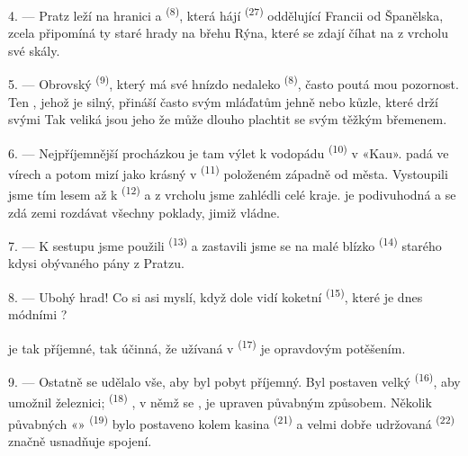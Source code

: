 4. --- Pratz leží na hranici a  \textsuperscript{(8)}, která hájí
 \textsuperscript{(27)} oddělující Francii od Španělska, zcela
připomíná ty staré hrady na břehu Rýna, které se zdají číhat na  z vrcholu své
skály.

5. --- Obrovský  \textsuperscript{(9)}, který má své hnízdo nedaleko
 \textsuperscript{(8)}, často poutá mou pozornost. Ten , jehož  je silný, přináší často svým mláďatům jehně nebo kůzle, které drží
svými  Tak veliká jsou jeho  že může dlouho plachtit se svým
těžkým břemenem.

\VUsaut{3.0mm}
\VUsaut{3.0mm}

6. --- Nejpříjemnější procházkou je tam výlet k vodopádu \textsuperscript{(10)} v «Kau».
 padá ve vírech a potom mizí jako krásný  v
 \textsuperscript{(11)} položeném západně od města. Vystoupili
jsme tím lesem až k  \textsuperscript{(12)} a z vrcholu
 jsme zahlédli celé  kraje.
 je podivuhodná a  se zdá zemi rozdávat všechny
poklady, jimiž vládne.

7. --- K sestupu jsme použili  \textsuperscript{(13)} a zastavili jsme se na
malé  blízko  \textsuperscript{(14)} starého
 kdysi obývaného pány z Pratzu.

8. --- Ubohý hrad! Co si asi myslí, když dole vidí koketní 
\textsuperscript{(15)}, které je dnes módními ?

 je tak příjemné,  tak účinná, že
 užívaná v  \textsuperscript{(17)} je opravdovým
potěšením.

\VUsaut{3.0mm}
\VUsaut{3.0mm}

9. --- Ostatně se udělalo vše, aby byl pobyt příjemný. Byl postaven velký
 \textsuperscript{(16)}, aby umožnil železnici; 
\textsuperscript{(18)} , v němž se , je upraven
půvabným způsobem. Několik půvabných «» \textsuperscript{(19)} bylo postaveno
kolem kasina \textsuperscript{(21)} a velmi dobře udržovaná
 \textsuperscript{(22)} značně usnadňuje spojení.


